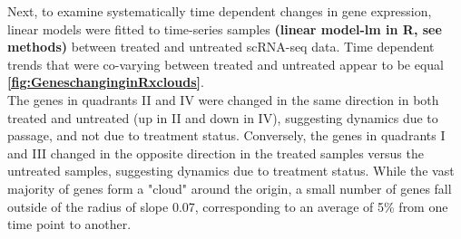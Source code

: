 Next, to examine systematically time dependent changes in gene expression, linear models were fitted to time-series samples \textbf{(linear model-lm in R, see methods)} between treated and untreated scRNA-seq data. 
Time dependent trends that were co-varying between treated and untreated appear to be equal \textbf{\autoref{fig:GeneschanginginRxclouds}}. 
\\
The genes in quadrants II and IV were changed in the same direction in both treated and untreated (up in II and down in IV), suggesting dynamics due to passage, and not due to treatment status. Conversely, the genes in quadrants I and III changed in the opposite direction in the treated samples versus the untreated samples, suggesting dynamics due to treatment status. While the vast majority of genes form a "cloud" around the origin, a small number of genes fall outside of the radius of slope 0.07, corresponding to an average of 5\% from one time point to another. 

